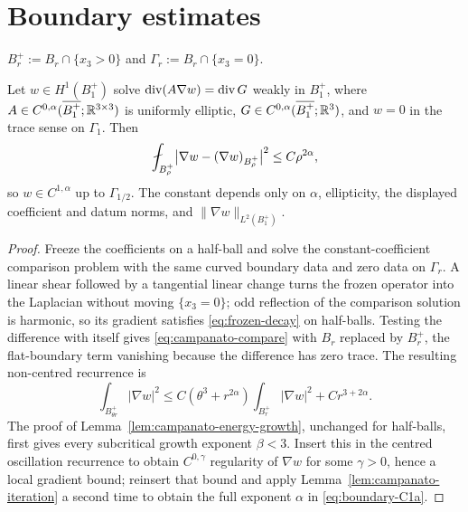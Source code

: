 \section{Boundary estimates}\label{sec:boundary-estimates}

\begin{notation}\label{not:half-ball}
$B_r^+:=B_r\cap\{x_3>0\}$ and $\Gamma_r:=B_r\cap\{x_3=0\}$.
\end{notation}

\begin{theorem}\label{thm:boundary-C1a}
Let $w\in H^1(B_1^+)$ solve $\operatorname{div}(A\nabla w)=\operatorname{div} G$ weakly in $B_1^+$,
where $A\in C^{0,\alpha}(\overline{B_1^+};\mathbb R^{3\times3})$ is uniformly
elliptic, $G\in C^{0,\alpha}(\overline{B_1^+};\mathbb R^3)$, and $w=0$ in the
trace sense on $\Gamma_1$.  Then
\begin{equation}\label{eq:boundary-C1a}
  \avg_{B_\rho^+}\bigl|\nabla w-(\nabla w)_{B_\rho^+}\bigr|^2\le C\rho^{2\alpha},
\end{equation}
so $w\in C^{1,\alpha}$ up to $\Gamma_{1/2}$.
The constant depends only on $\alpha$, ellipticity, the displayed coefficient
and datum norms, and $\|\nabla w\|_{L^2(B_1^+)}$.
\end{theorem}

\begin{proof}
Freeze the coefficients on a half-ball and solve the constant-coefficient
comparison problem with the same curved boundary data and zero data on
$\Gamma_r$.  A linear shear followed by a tangential linear change turns the
frozen operator into the Laplacian without moving $\{x_3=0\}$; odd reflection
of the comparison solution is harmonic, so its gradient satisfies
\eqref{eq:frozen-decay} on half-balls.  Testing the difference with itself
gives \eqref{eq:campanato-compare} with $B_r$ replaced by $B_r^+$, the
flat-boundary term vanishing because the difference has zero trace.  The
resulting non-centred recurrence is
\[
 \int_{B_{\theta r}^+}|\nabla w|^2
 \le C(\theta^3+r^{2\alpha})\int_{B_r^+}|\nabla w|^2
      +Cr^{3+2\alpha}.
\]
The proof of Lemma~\ref{lem:campanato-energy-growth}, unchanged for
half-balls, first gives every subcritical growth exponent $\beta<3$.
Insert this in the centred oscillation recurrence to obtain
$C^{0,\gamma}$ regularity of $\nabla w$ for some $\gamma>0$, hence a local
gradient bound; reinsert that bound and apply
Lemma~\ref{lem:campanato-iteration} a second time to obtain the full exponent
$\alpha$ in \eqref{eq:boundary-C1a}.
\end{proof}


